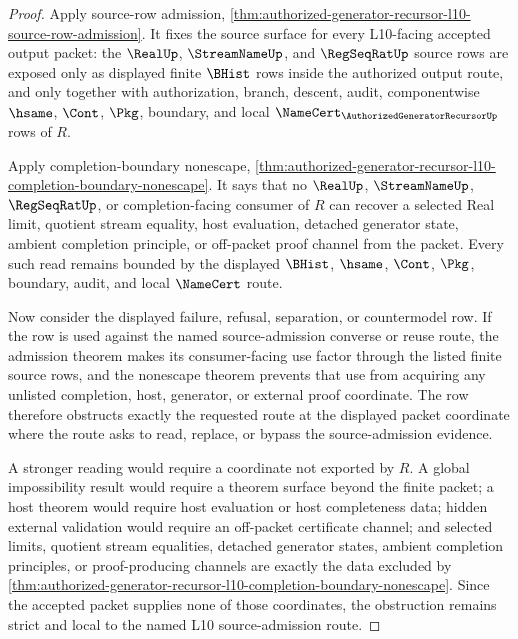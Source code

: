 \begin{proof}
Apply source-row admission, \autoref{thm:authorized-generator-recursor-l10-source-row-admission}. It fixes the source surface for every L10-facing accepted output packet: the $\RealUp$, $\StreamNameUp$, and $\RegSeqRatUp$ source rows are exposed only as displayed finite $\BHist$ rows inside the authorized output route, and only together with authorization, branch, descent, audit, componentwise $\hsame$, $\Cont$, $\Pkg$, boundary, and local $\NameCert_{\AuthorizedGeneratorRecursorUp}$ rows of $R$.

Apply completion-boundary nonescape, \autoref{thm:authorized-generator-recursor-l10-completion-boundary-nonescape}. It says that no $\RealUp$, $\StreamNameUp$, $\RegSeqRatUp$, or completion-facing consumer of $R$ can recover a selected Real limit, quotient stream equality, host evaluation, detached generator state, ambient completion principle, or off-packet proof channel from the packet. Every such read remains bounded by the displayed $\BHist$, $\hsame$, $\Cont$, $\Pkg$, boundary, audit, and local $\NameCert$ route.

Now consider the displayed failure, refusal, separation, or countermodel row. If the row is used against the named source-admission converse or reuse route, the admission theorem makes its consumer-facing use factor through the listed finite source rows, and the nonescape theorem prevents that use from acquiring any unlisted completion, host, generator, or external proof coordinate. The row therefore obstructs exactly the requested route at the displayed packet coordinate where the route asks to read, replace, or bypass the source-admission evidence.

A stronger reading would require a coordinate not exported by $R$. A global impossibility result would require a theorem surface beyond the finite packet; a host theorem would require host evaluation or host completeness data; hidden external validation would require an off-packet certificate channel; and selected limits, quotient stream equalities, detached generator states, ambient completion principles, or proof-producing channels are exactly the data excluded by \autoref{thm:authorized-generator-recursor-l10-completion-boundary-nonescape}. Since the accepted packet supplies none of those coordinates, the obstruction remains strict and local to the named L10 source-admission route.
\end{proof}
